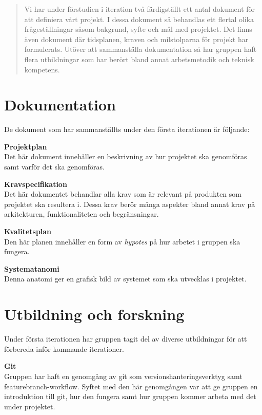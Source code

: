 \documentclass[a4paper,10pt]{article}
\begin{document}


\begin{abstract}
\noindent Vi har under förstudien i iteration två färdigställt ett antal dokument för att definiera vårt projekt. I dessa dokument så behandlas ett flertal olika frågeställningar såsom bakgrund, syfte och mål med projektet. Det finns även dokument där tidsplanen, kraven och milstolparna för projekt har formulerats. Utöver att sammanställa dokumentation så har gruppen haft flera utbildningar som har berört bland annat arbetsmetodik och teknisk kompetens.
\end{abstract}
\clearpage

\section{Dokumentation}
\label{sec:Dokumentation}
De dokument som har sammanställts under den första iterationen är följande:

\textbf{Projektplan}\\ Det här dokument innehåller en beskrivning av hur projektet ska genomföras samt varför det ska genomföras.

\textbf{Kravspecifikation}\\ Det här dokumentet behandlar alla krav som är relevant på produkten som projektet ska resultera i. Dessa krav berör många aspekter bland annat krav på arkitekturen, funktionaliteten och begränsningar.

\textbf{Kvalitetsplan}\\ Den här planen innehåller en form av \emph{hypotes} på hur arbetet i gruppen ska fungera.

\textbf{Systematanomi}\\ Denna anatomi ger en grafisk bild av systemet som ska utvecklas i projektet.

\section{Utbildning och forskning}
\label{sec:Utbildning och forskning}
Under första iterationen har gruppen tagit del av diverse utbildningar för att förbereda inför kommande iterationer.

\textbf{Git}\\ Gruppen har haft en genomgång av git som versionshanteringsverktyg samt featurebranch-workflow. Syftet med den här genomgången var att ge gruppen en introduktion till git, hur den fungera samt hur gruppen kommer arbeta med det under projektet.
\end{document}
